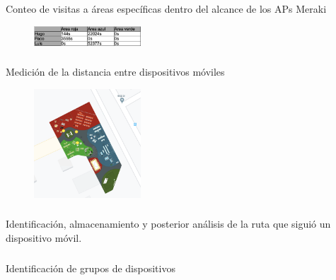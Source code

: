 \documentclass{beamer}
\begin{document}
\begin{frame}
\frametitle{\currentname}
Conteo de visitas a áreas específicas dentro del alcance de los APs Meraki
\begin{figure}[H]
\includegraphics[width=4cm]{img/tablapos.png}
\end{figure}
\end{frame}

\begin{frame}
\frametitle{\currentname}
Medición de la distancia entre dispositivos móviles
\begin{figure}[H]
\includegraphics[width=4cm]{img/posiciones.png}
\end{figure}
\end{frame}

\begin{frame}
\frametitle{\currentname}
Identificación, almacenamiento y posterior análisis de la ruta que siguió un dispositivo móvil.
\end{frame}

\begin{frame}
\frametitle{\currentname}
Identificación de grupos de dispositivos
\end{frame}
\end{document}
